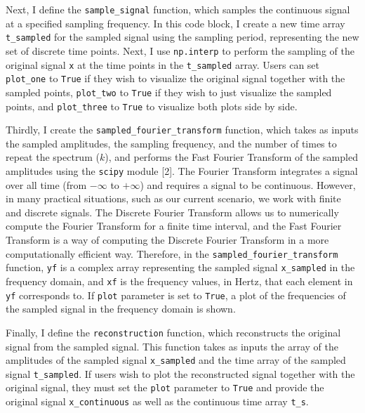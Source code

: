 \documentclass{article}
\begin{document}
Next, I define the \verb|sample_signal| function, which samples the continuous signal at a specified sampling frequency.
In this code block, I create a new time array \verb|t_sampled| for the sampled signal using the sampling period, representing the new set of discrete time points. 
Next, I use \verb|np.interp| to perform the sampling of the original signal \verb|x| at the time points in the \verb|t_sampled| array.
Users can set \verb|plot_one| to \verb|True| if they wish to visualize the original signal together with the sampled points, \verb|plot_two| to \verb|True| if they wish to just visualize the sampled points, and \verb|plot_three| to \verb|True| to visualize both plots side by side.

Thirdly, I create the \verb|sampled_fourier_transform| function, which takes as inputs the sampled amplitudes, the sampling frequency, and the number of times to repeat the spectrum ($k$), 
and performs the Fast Fourier Transform of the sampled amplitudes using the \verb|scipy| module [2].
The Fourier Transform integrates a signal over all time (from $-\infty$ to $+\infty$) and requires a signal to be continuous. 
However, in many practical situations, such as our current scenario, we work with finite and discrete signals. 
The Discrete Fourier Transform allows us to numerically compute the Fourier Transform for a finite time interval, 
and the Fast Fourier Transform is a way of computing the Discrete Fourier Transform in a more computationally efficient way. 
Therefore, in the \verb|sampled_fourier_transform| function, \verb|yf| is a complex array representing the sampled signal \verb|x_sampled| in the frequency domain, 
and \verb|xf| is the frequency values, in Hertz, that each element in \verb|yf| corresponds to. %
If \verb|plot| parameter is set to \verb|True|, a plot of the frequencies of the sampled signal in the frequency domain is shown.

Finally, I define the \verb|reconstruction| function, which reconstructs the original signal from the sampled signal.
This function takes as inputs the array of the amplitudes of the sampled signal \verb|x_sampled| and the time array of the sampled signal \verb|t_sampled|.
If users wish to plot the reconstructed signal together with the original signal, they must set the \verb|plot| parameter to \verb|True| and provide the original signal \verb|x_continuous| as well as the continuous time array \verb|t_s|.
\end{document}
